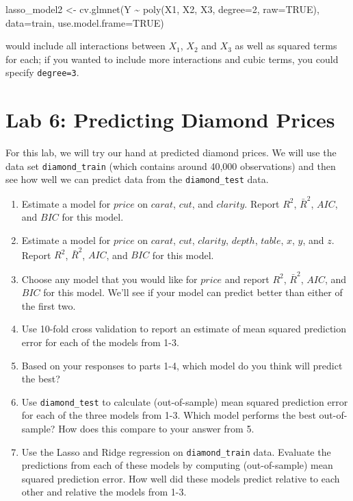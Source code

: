 \documentclass[
  letterpaper,
  DIV=11,
  numbers=noendperiod]{scrreprt}
\newenvironment{Shaded}{\begin{snugshade}}{\end{snugshade}}
\newcommand{\AttributeTok}[1]{\textcolor[rgb]{0.40,0.45,0.13}{#1}}
\newcommand{\ConstantTok}[1]{\textcolor[rgb]{0.56,0.35,0.01}{#1}}
\newcommand{\DecValTok}[1]{\textcolor[rgb]{0.68,0.00,0.00}{#1}}
\newcommand{\FunctionTok}[1]{\textcolor[rgb]{0.28,0.35,0.67}{#1}}
\newcommand{\NormalTok}[1]{\textcolor[rgb]{0.00,0.23,0.31}{#1}}
\newcommand{\OtherTok}[1]{\textcolor[rgb]{0.00,0.23,0.31}{#1}}
\newcommand{\SpecialCharTok}[1]{\textcolor[rgb]{0.37,0.37,0.37}{#1}}
\begin{document}
\begin{Shaded}
\begin{Highlighting}[]
\NormalTok{lasso\_model2 }\OtherTok{\textless{}{-}} \FunctionTok{cv.glmnet}\NormalTok{(Y }\SpecialCharTok{\textasciitilde{}} \FunctionTok{poly}\NormalTok{(X1, X2, X3, }\AttributeTok{degree=}\DecValTok{2}\NormalTok{, }\AttributeTok{raw=}\ConstantTok{TRUE}\NormalTok{),}
                          \AttributeTok{data=}\NormalTok{train,}
                          \AttributeTok{use.model.frame=}\ConstantTok{TRUE}\NormalTok{)}
\end{Highlighting}
\end{Shaded}

would include all interactions between \(X_1\), \(X_2\) and \(X_3\) as
well as squared terms for each; if you wanted to include more
interactions and cubic terms, you could specify \texttt{degree=3}.

\section{Lab 6: Predicting Diamond
Prices}\label{lab-6-predicting-diamond-prices}

For this lab, we will try our hand at predicted diamond prices. We will
use the data set \texttt{diamond\_train} (which contains around 40,000
observations) and then see how well we can predict data from the
\texttt{diamond\_test} data.

\begin{enumerate}
\def\labelenumi{\arabic{enumi}.}
\item
  Estimate a model for \(price\) on \(carat\), \(cut\), and \(clarity\).
  Report \(R^2\), \(\bar{R}^2\), \(AIC\), and \(BIC\) for this model.
\item
  Estimate a model for \(price\) on \(carat\), \(cut\), \(clarity\),
  \(depth\), \(table\), \(x\), \(y\), and \(z\). Report \(R^2\),
  \(\bar{R}^2\), \(AIC\), and \(BIC\) for this model.
\item
  Choose any model that you would like for \(price\) and report \(R^2\),
  \(\bar{R}^2\), \(AIC\), and \(BIC\) for this model. We'll see if your
  model can predict better than either of the first two.
\item
  Use 10-fold cross validation to report an estimate of mean squared
  prediction error for each of the models from 1-3.
\item
  Based on your responses to parts 1-4, which model do you think will
  predict the best?
\item
  Use \texttt{diamond\_test} to calculate (out-of-sample) mean squared
  prediction error for each of the three models from 1-3. Which model
  performs the best out-of-sample? How does this compare to your answer
  from 5.
\item
  Use the Lasso and Ridge regression on \texttt{diamond\_train} data.
  Evaluate the predictions from each of these models by computing
  (out-of-sample) mean squared prediction error. How well did these
  models predict relative to each other and relative the models from
  1-3.
\end{enumerate}
\end{document}
